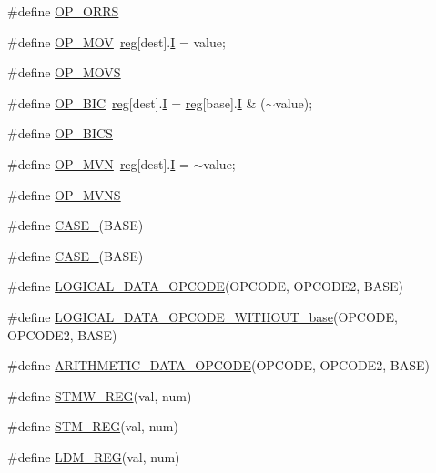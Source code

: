 \begin{DoxyCompactItemize}
\item 
\#define \mbox{\hyperlink{_g_b_a_8cpp_aa6aa149e69144102013a4cb4671f9fe3}{O\+P\+\_\+\+O\+R\+RS}}
\item 
\#define \mbox{\hyperlink{_g_b_a_8cpp_ad6d5446fd6da89ab6e4babec5135db6f}{O\+P\+\_\+\+M\+OV}}~\mbox{\hyperlink{_globals_8h_ae29faba89509024ffd1a292badcedf2d}{reg}}\mbox{[}dest\mbox{]}.\mbox{\hyperlink{thumb_8h_a782b7c7c9a56a2031f6270eac7f000d6}{I}} = value;
\item 
\#define \mbox{\hyperlink{_g_b_a_8cpp_a349e8ba1c82ebd2e652e8421b7d6fa32}{O\+P\+\_\+\+M\+O\+VS}}
\item 
\#define \mbox{\hyperlink{_g_b_a_8cpp_a9421adf153ebdde8ec8e42d15fb17489}{O\+P\+\_\+\+B\+IC}}~\mbox{\hyperlink{_globals_8h_ae29faba89509024ffd1a292badcedf2d}{reg}}\mbox{[}dest\mbox{]}.\mbox{\hyperlink{thumb_8h_a782b7c7c9a56a2031f6270eac7f000d6}{I}} = \mbox{\hyperlink{_globals_8h_ae29faba89509024ffd1a292badcedf2d}{reg}}\mbox{[}base\mbox{]}.\mbox{\hyperlink{thumb_8h_a782b7c7c9a56a2031f6270eac7f000d6}{I}} \& ($\sim$value);
\item 
\#define \mbox{\hyperlink{_g_b_a_8cpp_a45564882500158608a5537bae07be76a}{O\+P\+\_\+\+B\+I\+CS}}
\item 
\#define \mbox{\hyperlink{_g_b_a_8cpp_abe78869a84343f6d31f91a5b991f0798}{O\+P\+\_\+\+M\+VN}}~\mbox{\hyperlink{_globals_8h_ae29faba89509024ffd1a292badcedf2d}{reg}}\mbox{[}dest\mbox{]}.\mbox{\hyperlink{thumb_8h_a782b7c7c9a56a2031f6270eac7f000d6}{I}} = $\sim$value;
\item 
\#define \mbox{\hyperlink{_g_b_a_8cpp_a270f1afdc09887a7da5dcaa6c52004c1}{O\+P\+\_\+\+M\+V\+NS}}
\item 
\#define \mbox{\hyperlink{_g_b_a_8cpp_a7dc7875774844a4717dfa1e8ecbc069c}{C\+A\+S\+E\+\_}}(B\+A\+SE)
\item 
\#define \mbox{\hyperlink{_g_b_a_8cpp_a47d620846f3e6737dd5142ab2b9f726c}{C\+A\+S\+E\+\_}}(B\+A\+SE)
\item 
\#define \mbox{\hyperlink{_g_b_a_8cpp_a8419e17f23a9a680a1714593e97a0d24}{L\+O\+G\+I\+C\+A\+L\+\_\+\+D\+A\+T\+A\+\_\+\+O\+P\+C\+O\+DE}}(O\+P\+C\+O\+DE,  O\+P\+C\+O\+D\+E2,  B\+A\+SE)
\item 
\#define \mbox{\hyperlink{_g_b_a_8cpp_a8d9b3e3a40249498830429b9bef904c3}{L\+O\+G\+I\+C\+A\+L\+\_\+\+D\+A\+T\+A\+\_\+\+O\+P\+C\+O\+D\+E\+\_\+\+W\+I\+T\+H\+O\+U\+T\+\_\+base}}(O\+P\+C\+O\+DE,  O\+P\+C\+O\+D\+E2,  B\+A\+SE)
\item 
\#define \mbox{\hyperlink{_g_b_a_8cpp_a6e5dde54bbb146172614913781ede32e}{A\+R\+I\+T\+H\+M\+E\+T\+I\+C\+\_\+\+D\+A\+T\+A\+\_\+\+O\+P\+C\+O\+DE}}(O\+P\+C\+O\+DE,  O\+P\+C\+O\+D\+E2,  B\+A\+SE)
\item 
\#define \mbox{\hyperlink{_g_b_a_8cpp_a0d1e406c5edc8a5d05485c789df35b1d}{S\+T\+M\+W\+\_\+\+R\+EG}}(val,  num)
\item 
\#define \mbox{\hyperlink{_g_b_a_8cpp_a4e029c81c1b7f6a28d49485aff8d74b8}{S\+T\+M\+\_\+\+R\+EG}}(val,  num)
\item 
\#define \mbox{\hyperlink{_g_b_a_8cpp_a8670776045bbd8e8ee77d691a10b1068}{L\+D\+M\+\_\+\+R\+EG}}(val,  num)
\end{DoxyCompactItemize}
